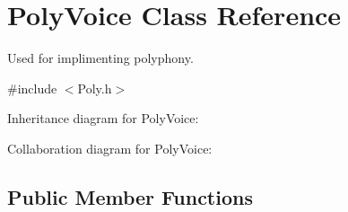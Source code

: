 \hypertarget{class_poly_voice}{}\section{Poly\+Voice Class Reference}
\label{class_poly_voice}


Used for implimenting polyphony.  




{\ttfamily \#include $<$Poly.\+h$>$}



Inheritance diagram for Poly\+Voice\+:


Collaboration diagram for Poly\+Voice\+:
\subsection*{Public Member Functions}
